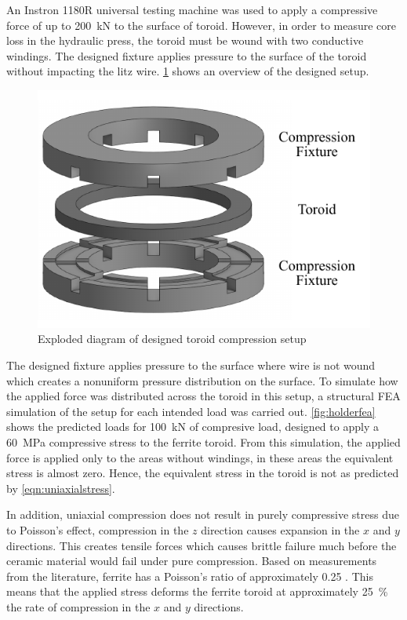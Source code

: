 \documentclass[conference]{IEEEtran}
\begin{document}
An Instron 1180R universal testing machine was used to apply a compressive force of up to \SI{200}{\kilo\newton} to the surface of toroid. 
However, in order to measure core loss in the hydraulic press, the toroid must be wound with two conductive windings. 
The designed fixture applies pressure to the surface of the toroid without impacting the litz wire.
\cref{fig:compressionholder} shows an overview of the designed setup. 

\begin{figure}
  \centering
  \includegraphics{figures/compressionholder.pdf}
  \caption{Exploded diagram of designed toroid compression setup}
  \label{fig:compressionholder}
\end{figure}

The designed fixture applies pressure to the surface where wire is not wound which creates a nonuniform pressure distribution on the surface. 
To simulate how the applied force was distributed across the toroid in this setup, a structural FEA simulation of the setup for each intended load was carried out. 
\cref{fig:holderfea} shows the predicted loads for \SI{100}{\kilo\newton} of compresive load, designed to apply a \SI{60}{\mega\pascal} compressive stress to the ferrite toroid.
From this simulation, the applied force is applied only to the areas without windings, in these areas the equivalent stress is almost zero. 
Hence, the equivalent stress in the toroid is not as predicted by \cref{eqn:uniaxialstress}. 

In addition, uniaxial compression does not result in purely compressive stress due to Poisson's effect, compression in the $z$ direction causes expansion in the $x$ and $y$ directions.
This creates tensile forces which causes brittle failure much before the ceramic material would fail under pure compression. 
Based on measurements from the literature, ferrite has a Poisson's ratio of approximately 0.25 \cite{moinuddinElasticBehaviourMnZn1993}.
This means that the applied stress deforms the ferrite toroid at approximately \SI{25}{\percent} the rate of compression in the $x$ and $y$ directions.
\end{document}
